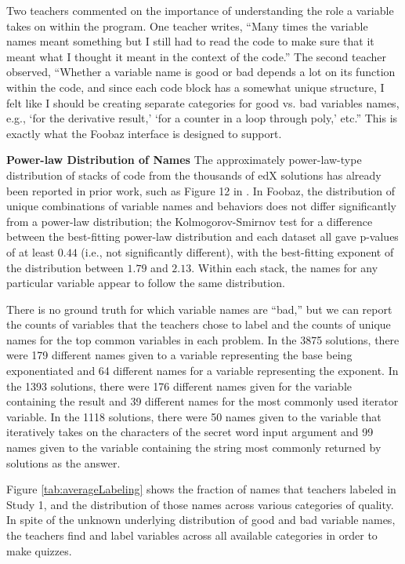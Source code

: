 Two teachers commented on the importance of understanding the role a variable takes on within the program. One teacher writes, ``Many times the variable names meant something but I still had to read the code to make sure that it meant what I thought it meant in the context of the code.'' The second teacher observed, ``Whether a variable name is good or bad depends a lot on its function within the code, and since each code block has a somewhat unique structure, I felt like I should be creating separate categories for good vs. bad variables names, e.g., `for the derivative result,' `for a counter in a loop through poly,' etc.'' This is exactly what the Foobaz interface is designed to support. 

\textbf{Power-law Distribution of Names}
The approximately power-law-type distribution of stacks of code from the thousands of edX solutions has already been reported in prior work, such as Figure 12 in \cite{overcode}. In Foobaz, the distribution of unique combinations of variable names and behaviors does not differ
significantly from a power-law distribution; the Kolmogorov-Smirnov test for a difference between the best-fitting power-law distribution and each dataset all gave p-values of at least $0.44$ (i.e., not significantly different), with the best-fitting exponent of the distribution between
$1.79$ and $2.13$. Within each stack, the names for any particular variable appear to follow the same distribution.

There is no ground truth for which variable names are ``bad,'' but we can report the counts of variables that the teachers chose to label and the counts of unique names for the top common variables in each problem. In the 3875  solutions, there were 179 different names given to a variable representing the base being exponentiated and 64 different names for a variable representing the exponent. In the 1393  solutions, there were 176 different names given for the variable containing the result and 39 different names for the most commonly used iterator variable. In the 1118  solutions, there were 50 names given to the variable that iteratively takes on the characters of the secret word input argument and 99 names given to the variable containing the string most commonly returned by solutions as the answer. 

Figure \ref{tab:averageLabeling} shows the fraction of names that teachers labeled in Study 1, and the distribution of those names across various categories of quality. In spite of the unknown underlying distribution of good and bad variable names, the teachers find and label variables across all available categories in order to make quizzes.
 
